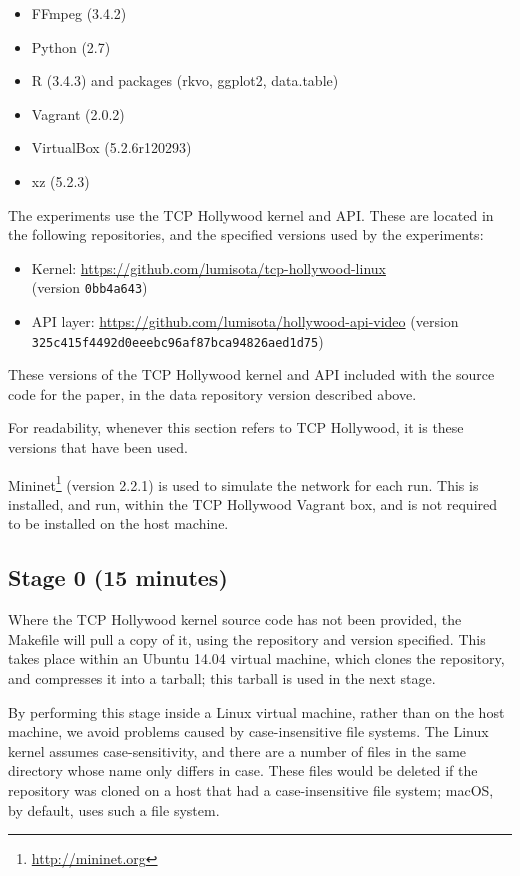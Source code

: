 \documentclass[sigconf]{acmart}
\begin{document}
\begin{itemize}
\item FFmpeg (3.4.2)
\item Python (2.7)
\item R (3.4.3) and packages (rkvo, ggplot2, data.table)
\item Vagrant (2.0.2)
\item VirtualBox (5.2.6r120293)
\item xz (5.2.3)
\end{itemize}

The experiments use the TCP Hollywood kernel and API. These are located in the following
repositories, and the specified versions used by the experiments:

\begin{itemize}
\item Kernel: \url{https://github.com/lumisota/tcp-hollywood-linux} \\ (version \texttt{0bb4a643})
\item API layer: \url{https://github.com/lumisota/hollywood-api-video} (version \texttt{325c415f4492d0eeebc96af87bca94826aed1d75})
\end{itemize}

These versions of the TCP Hollywood kernel and API included with the source code for the
paper, in the data repository version described above.

For readability, whenever this section refers to TCP Hollywood, it is these versions that
have been used.

Mininet\footnote{\url{http://mininet.org}} (version 2.2.1) is used to simulate the network
for each run. This is installed, and run, within the TCP Hollywood Vagrant box, and is
not required to be installed on the host machine.

\subsection*{Stage 0 (15 minutes)}

Where the TCP Hollywood kernel source code has not been provided, the Makefile will pull
a copy of it, using the repository and version specified. This takes place within an
Ubuntu 14.04 virtual machine, which clones the repository, and compresses it into a 
tarball; this tarball is used in the next stage.

By performing this stage inside a Linux virtual machine, rather than on the host
machine, we avoid problems caused by case-insensitive file systems. The Linux kernel
assumes case-sensitivity, and there are a number of files in the same directory whose
name only differs in case. These files would be deleted if the repository was cloned on
a host that had a case-insensitive file system; macOS, by default, uses such a file system.
\end{document}
